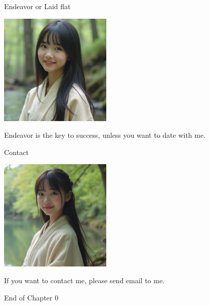 \documentclass{beamer}
\begin{document}
\begin{frame}{Endeavor or Laid flat}
\begin{center}
\includegraphics[width=0.4\textwidth]{fail.png}
\end{center}
\begin{center}
Endeavor is the key to success, unless you want to date with me.
\end{center}
\end{frame}
\begin{frame}{Contact}
\begin{center}
\includegraphics[width=0.4\textwidth]{kg.png}
\end{center}
\begin{center}
If you want to contact me, please send email to me.
\end{center}
\end{frame}
\begin{frame}{}
\begin{center}
\Large{End of Chapter 0}
\end{center}
\end{frame}
\end{document}
